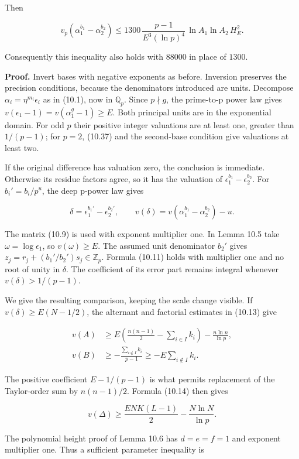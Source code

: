 \documentclass[
  11pt,
  a4paper,
]{article}
\begin{document}
Then

\[
v_p(\alpha_1^{b_1}-\alpha_2^{b_2})
\le1300\,\frac{p-1}{E^3(\ln p)^4}\,
\ln A_1\ln A_2\,H_E^2.
\tag{10.39}
\]

Consequently this inequality also holds with \(88000\) in place of
\(1300\).

\textbf{Proof.} Invert bases with negative exponents as before.
Inversion preserves the precision conditions, because the denominators
introduced are units. Decompose \(\alpha_i=\eta^{m_i}\epsilon_i\) as in
(10.1), now in \(\mathbb Q_p\). Since \(p\nmid g\), the prime-to-p power
law gives \(v(\epsilon_1-1)=v(\alpha_1^g-1)\ge E\). Both principal units
are in the exponential domain. For odd \(p\) their positive integer
valuations are at least one, greater than \(1/(p-1)\); for \(p=2\),
(10.37) and the second-base condition give valuations at least two.

If the original difference has valuation zero, the conclusion is
immediate. Otherwise its residue factors agree, so it has the valuation
of \(\epsilon_1^{b_1}-\epsilon_2^{b_2}\). For \(b_i'=b_i/p^u\), the deep
p-power law gives

\[
\delta=\epsilon_1^{b_1'}-\epsilon_2^{b_2'},
\qquad v(\delta)=v(\alpha_1^{b_1}-\alpha_2^{b_2})-u.
\]

The matrix (10.9) is used with exponent multiplier one. In Lemma 10.5
take \(\omega=\log\epsilon_1\), so \(v(\omega)\ge E\). The assumed unit
denominator \(b_2'\) gives \(z_j=r_j+(b_1'/b_2')s_j\in\mathbb Z_p\).
Formula (10.11) holds with multiplier one and no root of unity in
\(\delta\). The coefficient of its error part remains integral whenever
\(v(\delta)>1/(p-1)\).

We give the resulting comparison, keeping the scale change visible. If
\(v(\delta)\ge E(N-1/2)\), the alternant and factorial estimates in
(10.13) give

\[
\begin{aligned}
v(A)&\ge E\left(\frac{n(n-1)}2-\sum_{i\in I}k_i\right)-\frac{n\ln n}{\ln p},\\
v(B)&\ge-\frac{\sum_{i\notin I}k_i}{p-1}
\ge-E\sum_{i\notin I}k_i.
\end{aligned}
\]

The positive coefficient \(E-1/(p-1)\) is what permits replacement of
the Taylor-order sum by \(n(n-1)/2\). Formula (10.14) then gives

\[
v(\Delta)\ge\frac{ENK(L-1)}2-\frac{N\ln N}{\ln p}.
\]

The polynomial height proof of Lemma 10.6 has \(d=e=f=1\) and exponent
multiplier one. Thus a sufficient parameter inequality is
\end{document}
